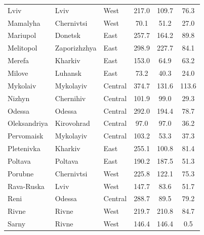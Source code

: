 \documentclass[sn-basic]{sn-jnl}%
\begin{document}
{\begin{appendices}
\begin{longtable}{lllccc}
Lviv                & Lviv            & West    & 217.0                                & 109.7 & 76.3      \\
Mamalyha            & Chernivtsi      & West    & 70.1                                 & 51.2  & 27.0      \\
Mariupol            & Donetsk         & East    & 257.7                                & 164.2 & 89.8      \\
Melitopol           & Zaporizhzhya    & East    & 298.9                                & 227.7 & 84.1      \\
Merefa              & Kharkiv         & East    & 153.0                                & 64.9  & 63.2      \\
Milove              & Luhansk         & East    & 73.2                                 & 40.3  & 24.0      \\
Mykolaiv            & Mykolayiv       & Central & 374.7                                & 131.6 & 113.6     \\
Nizhyn              & Chernihiv       & Central & 101.9                                & 99.0  & 29.3      \\
Odessa              & Odessa          & Central & 292.0                                & 194.4 & 78.7      \\
Oleksandriya        & Kirovohrad      & Central & 97.0                                 & 97.0  & 36.2      \\
Pervomaisk          & Mykolayiv       & Central & 103.2                                & 53.3  & 37.3      \\
Pletenivka          & Kharkiv         & East    & 255.1                                & 100.8 & 81.4      \\
Poltava             & Poltava         & East    & 190.2                                & 187.5 & 51.3      \\
Porubne             & Chernivtsi      & West    & 225.8                                & 122.1 & 75.3      \\
Rava-Ruska          & Lviv            & West    & 147.7                                & 83.6  & 51.7      \\
Reni                & Odessa          & Central & 288.7                                & 89.5  & 79.2      \\
Rivne               & Rivne           & West    & 219.7                                & 210.8 & 84.7      \\
Sarny               & Rivne           & West    & 146.4                                & 146.4 & 0.5       \\

\end{longtable}
\end{appendices}}
\end{document}

